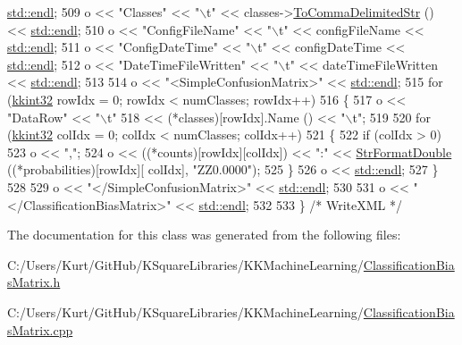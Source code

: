 \begin{DoxyCode}
      \hyperlink{namespace_k_k_b_ad1f50f65af6adc8fa9e6f62d007818a8}{std::endl};
509   o << \textcolor{stringliteral}{"Classes"}             << \textcolor{stringliteral}{"\(\backslash\)t"} << classes->\hyperlink{class_k_k_m_l_l_1_1_m_l_class_list_a2842ee0f0a658c29988b02bf5cbe19d7}{ToCommaDelimitedStr} () << 
      \hyperlink{namespace_k_k_b_ad1f50f65af6adc8fa9e6f62d007818a8}{std::endl};
510   o << \textcolor{stringliteral}{"ConfigFileName"}      << \textcolor{stringliteral}{"\(\backslash\)t"} << configFileName                  << 
      \hyperlink{namespace_k_k_b_ad1f50f65af6adc8fa9e6f62d007818a8}{std::endl};
511   o << \textcolor{stringliteral}{"ConfigDateTime"}      << \textcolor{stringliteral}{"\(\backslash\)t"} << configDateTime                  << 
      \hyperlink{namespace_k_k_b_ad1f50f65af6adc8fa9e6f62d007818a8}{std::endl};
512   o << \textcolor{stringliteral}{"DateTimeFileWritten"} << \textcolor{stringliteral}{"\(\backslash\)t"} << dateTimeFileWritten             << 
      \hyperlink{namespace_k_k_b_ad1f50f65af6adc8fa9e6f62d007818a8}{std::endl};
513 
514   o << \textcolor{stringliteral}{"<SimpleConfusionMatrix>"} << \hyperlink{namespace_k_k_b_ad1f50f65af6adc8fa9e6f62d007818a8}{std::endl};
515   \textcolor{keywordflow}{for}  (\hyperlink{namespace_k_k_b_a8fa4952cc84fda1de4bec1fbdd8d5b1b}{kkint32} rowIdx = 0;  rowIdx < numClasses;  rowIdx++)
516   \{
517     o << \textcolor{stringliteral}{"DataRow"}                  << \textcolor{stringliteral}{"\(\backslash\)t"} 
518       << (*classes)[rowIdx].Name () << \textcolor{stringliteral}{"\(\backslash\)t"};
519 
520     \textcolor{keywordflow}{for}  (\hyperlink{namespace_k_k_b_a8fa4952cc84fda1de4bec1fbdd8d5b1b}{kkint32} colIdx = 0;  colIdx < numClasses;  colIdx++)
521     \{
522       \textcolor{keywordflow}{if}  (colIdx > 0)
523         o << \textcolor{stringliteral}{","};
524       o << ((*counts)[rowIdx][colIdx]) << \textcolor{stringliteral}{":"} << \hyperlink{namespace_k_k_b_a1a40a40e955fa5417a7cdd990e0021b1}{StrFormatDouble} ((*probabilities)[rowIdx][
      colIdx], \textcolor{stringliteral}{"ZZ0.0000"});
525     \}
526     o << \hyperlink{namespace_k_k_b_ad1f50f65af6adc8fa9e6f62d007818a8}{std::endl};
527   \}
528 
529   o << \textcolor{stringliteral}{"</SimpleConfusionMatrix>"} << \hyperlink{namespace_k_k_b_ad1f50f65af6adc8fa9e6f62d007818a8}{std::endl};
530 
531   o << \textcolor{stringliteral}{"</ClassificationBiasMatrix>"}  << \hyperlink{namespace_k_k_b_ad1f50f65af6adc8fa9e6f62d007818a8}{std::endl};
532 
533 \}  \textcolor{comment}{/* WriteXML */}
\end{DoxyCode}


The documentation for this class was generated from the following files\+:\begin{DoxyCompactItemize}
\item 
C\+:/\+Users/\+Kurt/\+Git\+Hub/\+K\+Square\+Libraries/\+K\+K\+Machine\+Learning/\hyperlink{_classification_bias_matrix_8h}{Classification\+Bias\+Matrix.\+h}\item 
C\+:/\+Users/\+Kurt/\+Git\+Hub/\+K\+Square\+Libraries/\+K\+K\+Machine\+Learning/\hyperlink{_classification_bias_matrix_8cpp}{Classification\+Bias\+Matrix.\+cpp}\end{DoxyCompactItemize}
